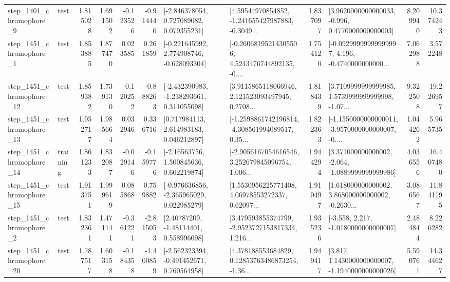 \begin{tabular}{llrrrrllrlrr}
  step\_1401\_chromophore\_9 &      test &      1.815028 &    1.691502 &     -0.123526 & -0.914440 &    [-2.846378054, 0.727089082, 0.079355231] &  [4.59544970854852, -1.241655427987883, -0.3049... &       1.837097 &   [3.9620000000000033, -0.996, 0.4770000000000003] &            8.209940 &         10.374243 \\
  step\_1451\_chromophore\_1 &      test &      1.853885 &    1.877470 &      0.023585 &  0.261859 &   [-0.221645992, 2.774908746, -0.628093304] &  [-0.26068195214305506, 4.5243476744892135, -0.... &       1.754120 &  [-0.09299999999999997, 4.196, -0.4740000000000... &            7.062988 &          3.572248 \\
 step\_1451\_chromophore\_12 &      test &      1.859382 &    1.739130 &     -0.120252 & -0.888263 &   [-2.432390983, -1.238293661, 0.311055098] &  [3.9115865118066946, 2.121523093497945, 0.2708... &       1.818439 &  [3.7109999999999985, 1.5739999999999998, -1.07... &            9.322508 &         19.226957 \\
 step\_1451\_chromophore\_13 &      test &      1.952717 &    1.985664 &      0.032946 &  0.336716 &     [0.717984113, 2.614983183, 0.046212897] &  [-1.2598861742196814, -4.308561994089517, 0.35... &       1.822363 &  [-1.1550000000000011, -3.9570000000000007, -0.... &            1.044262 &          5.965735 \\
 step\_1451\_chromophore\_14 &  training &      1.861233 &    1.832087 &     -0.029146 & -0.159776 &     [-2.16563756, 1.500845636, 0.602219874] &  [-2.9056167054616546, 3.252679845096754, 1.006... &       1.944294 &   [3.371000000000002, -2.064, -1.0889999999999986] &            4.036556 &         16.407480 \\
 step\_1451\_chromophore\_15 &      test &      1.913751 &    1.999619 &      0.085868 &  0.759882 &   [-0.976636856, -2.365965029, 0.022985279] &  [1.5530956225771408, 4.06978553272337, 0.62097... &       1.910497 &  [1.618000000000002, 3.868000000000002, -0.2630... &            3.086567 &         11.841195 \\
  step\_1451\_chromophore\_2 &      test &      1.832361 &    1.471141 &     -0.361221 & -2.815053 &      [2.40787209, -1.48114401, 0.558996098] &  [3.479593855374799, -2.9523727153817334, 1.216... &       1.935236 &               [-3.558, 2.217, -1.0180000000000007] &            2.484844 &          8.226282 \\
 step\_1451\_chromophore\_20 &      test &      1.787517 &    1.603158 &     -0.184358 & -1.400859 &   [-2.562323394, -0.491452671, 0.760564958] &  [4.378188553684829, 0.12853763486873254, -1.36... &       1.949417 &   [3.817, 1.1430000000000007, -1.1940000000000026] &            5.590761 &         14.344627 \\

\end{tabular}
